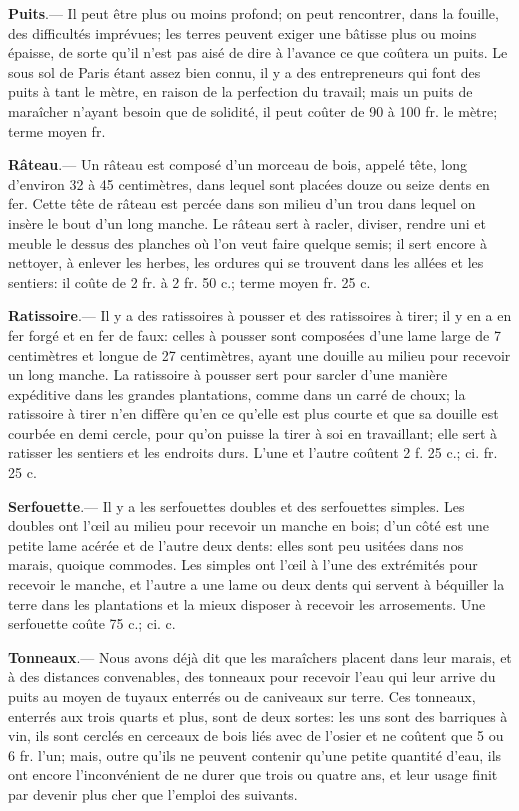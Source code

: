 \documentclass[10pt,a4paper]{book}
\begin{document}
\textbf{Puits}.--- Il peut être plus ou moins profond; on peut rencontrer, dans la fouille, des difficultés imprévues; les terres peuvent exiger une bâtisse plus ou moins épaisse, de sorte qu'il n'est pas aisé de dire à l'avance ce que coûtera un puits. Le sous sol de Paris étant assez bien connu, il y a des entrepreneurs qui font des puits à tant le mètre, en raison de la perfection du travail; mais un puits de maraîcher n'ayant besoin que de solidité, il peut coûter de 90 à 100 fr. le mètre; terme moyen  fr.

\textbf{Râteau}.--- Un râteau est composé d'un morceau de bois, appelé tête, long d'environ 32 à 45 centimètres, dans lequel sont placées douze ou seize dents en fer. Cette tête de râteau est percée dans son milieu d'un trou dans lequel on insère le bout d'un long manche. Le râteau sert à racler, diviser, rendre uni et meuble le dessus des planches où l'on veut faire quelque semis; il sert encore à nettoyer, à enlever les herbes, les ordures qui se trouvent dans les allées et les sentiers: il coûte de 2 fr. à 2 fr. 50 c.; terme moyen   fr. 25 c.

\textbf{Ratissoire}.--- Il y a des ratissoires à pousser et des ratissoires à tirer; il y en a en fer forgé et en fer de faux: celles à pousser sont composées d'une lame large de 7 centimètres et longue de 27 centimètres, ayant une douille au milieu pour recevoir un long manche. La ratissoire à pousser sert pour sarcler d'une manière expéditive dans les grandes plantations, comme dans un carré de choux; la ratissoire à tirer n'en diffère qu'en ce qu'elle est plus courte et que sa douille est courbée en demi cercle, pour qu'on puisse la tirer à soi en travaillant; elle sert à ratisser les sentiers et les endroits durs. L'une et l'autre coûtent 2 f. 25 c.; ci. fr. 25 c.

\textbf{Serfouette}.--- Il y a les serfouettes doubles et des serfouettes simples. Les doubles ont l'œil au milieu pour recevoir un manche en bois; d'un côté est une petite lame acérée et de l'autre deux dents: elles sont peu usitées dans nos marais, quoique commodes. Les simples ont l'œil à l'une des extrémités pour recevoir le manche, et l'autre a une lame ou deux dents qui servent à béquiller la terre dans les plantations et la mieux disposer à recevoir les arrosements. Une serfouette coûte 75 c.; ci. c.

\textbf{Tonneaux}.--- Nous avons déjà dit que les maraîchers placent dans leur marais, et à des distances convenables, des tonneaux pour recevoir l'eau qui leur arrive du puits au moyen de tuyaux enterrés ou de caniveaux sur terre. Ces tonneaux, enterrés aux trois quarts et plus, sont de deux sortes: les uns sont des barriques à vin, ils sont cerclés en cerceaux de bois liés avec de l'osier et ne coûtent que 5 ou 6 fr. l'un; mais, outre qu'ils ne peuvent contenir qu'une petite quantité d'eau, ils ont encore l'inconvénient de ne durer que trois ou quatre ans, et leur usage finit par devenir plus cher que l'emploi des suivants.
\end{document}
